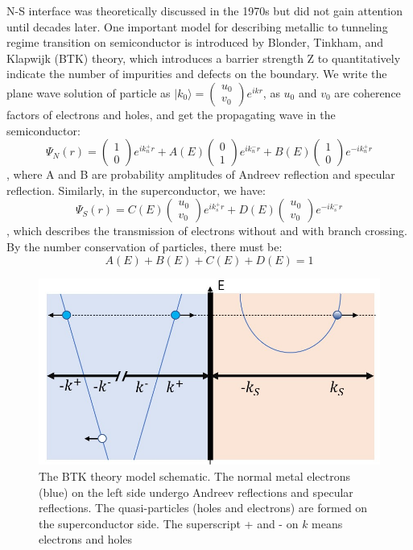 N-S interface was theoretically discussed in the 1970s but did not gain attention until decades later\cite{RN31, RN30}. One important model for describing metallic to tunneling regime transition on semiconductor is introduced by Blonder, Tinkham, and Klapwijk (BTK) theory\cite{RN31}, which introduces a barrier strength Z to quantitatively indicate the number of impurities and defects on the boundary. We write the plane wave solution of particle as $|k_0\rangle = \begin{pmatrix}
  u_0\\ 
  v_0
\end{pmatrix}e^{ikr}$, as $u_0$ and $v_0$ are coherence factors of electrons and holes, and get the propagating wave in the semiconductor:
\begin{equation}
    \Psi_N(r) = \begin{pmatrix}
  1\\ 
  0
\end{pmatrix}e^{ik_n^+r}+A(E)
\begin{pmatrix}
  0\\ 
  1
\end{pmatrix}e^{ik_n^-r}+B(E)
\begin{pmatrix}
  1\\ 
  0
\end{pmatrix}e^{-ik_n^+r}
\end{equation}
, where A and B are probability amplitudes of Andreev reflection and specular reflection. Similarly, in the superconductor, we have:
\begin{equation}
    \Psi_S(r) = C(E)
\begin{pmatrix}
  u_0\\ 
  v_0
\end{pmatrix}e^{ik_s^+r}+D(E)
\begin{pmatrix}
  u_0\\ 
  v_0
\end{pmatrix}e^{-ik_s^-r}
\end{equation}
, which describes the transmission of electrons without and with branch crossing. By the number conservation of particles, there must be:
\begin{equation}
    A(E) + B(E) + C(E) + D(E) = 1
\end{equation}
\begin{figure}[htbp]
    \centering
    \includegraphics[width=0.6\linewidth]{Pic/BTK_theory.jpg}
    \caption{The BTK theory model schematic. The normal metal electrons (blue) on the left side undergo Andreev reflections and specular reflections. The quasi-particles (holes and electrons) are formed on the superconductor side. The superscript + and - on $k$ means electrons and holes}
    \label{BTKtheorypic}
\end{figure}
